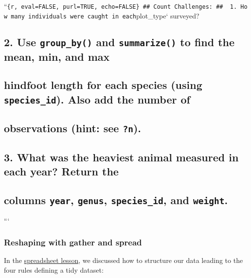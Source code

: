 \documentclass[]{article}
\begin{document}
``\texttt{\{r,\ eval=FALSE,\ purl=TRUE,\ echo=FALSE\}\ \#\#\ Count\ Challenges:\ \#\#\ \ 1.\ How\ many\ individuals\ were\ caught\ in\ each}plot\_type`
surveyed?

\subsection{\texorpdfstring{2. Use \texttt{group\_by()} and
\texttt{summarize()} to find the mean, min, and
max}{2. Use group\_by() and summarize() to find the mean, min, and max}}\label{use-group_by-and-summarize-to-find-the-mean-min-and-max}

\subsection{\texorpdfstring{hindfoot length for each species (using
\texttt{species\_id}). Also add the number
of}{hindfoot length for each species (using species\_id). Also add the number of}}\label{hindfoot-length-for-each-species-using-species_id.-also-add-the-number-of}

\subsection{\texorpdfstring{observations (hint: see
\texttt{?n}).}{observations (hint: see ?n).}}\label{observations-hint-see-n.}

\subsection{3. What was the heaviest animal measured in each year?
Return
the}\label{what-was-the-heaviest-animal-measured-in-each-year-return-the}

\subsection{\texorpdfstring{columns \texttt{year}, \texttt{genus},
\texttt{species\_id}, and
\texttt{weight}.}{columns year, genus, species\_id, and weight.}}\label{columns-year-genus-species_id-and-weight.}

```

\subsubsection{Reshaping with gather and
spread}\label{reshaping-with-gather-and-spread}

In the
\href{http://www.datacarpentry.org/spreadsheet-ecology-lesson/01-format-data/}{spreadsheet
lesson}, we discussed how to structure our data leading to the four
rules defining a tidy dataset:
\end{document}
